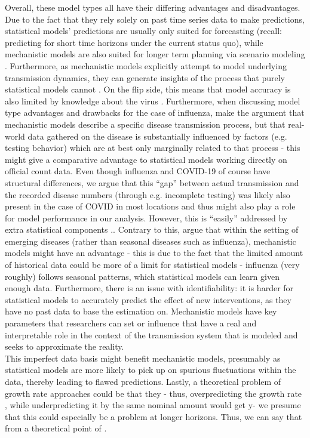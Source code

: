 Overall, these model types all have their differing advantages and disadvantages. Due to the fact that they rely solely on past time series data to make predictions, statistical models' predictions are usually only suited for forecasting (recall: predicting for short time horizons under the current status quo), while mechanistic models are also suited for longer term planning via scenario modeling \cite{reich_collaborative_2022}. Furthermore, as mechanistic models explicitly attempt to model underlying transmission dynamics, they can generate insights of the process that purely statistical models cannot \cite{james_use_2021} . On the flip side, this means that model accuracy is also limited by knowledge about the virus \cite{holmdahl_wrong_2020}. Furthermore, when discussing model type advantages and drawbacks for the case of influenza, \cite{reich_collaborative_2019} make the argument that mechanistic models describe a specific disease transmission process, but that real-world data gathered on the disease is substantially influenced by factors (e.g. testing behavior) which are at best only marginally related to that process - this might give a comparative advantage to statistical models working directly on official count data. Even though influenza and COVID-19 of course have structural differences, we argue that this ``gap'' between actual transmission and the recorded disease numbers (through e.g. incomplete testing) was likely also present in the case of COVID in most locations and thus might also play a role for model performance in our analysis. However, this is ``easily'' addressed by extra statistical components .. Contrary to this, \cite{bracher_evaluating_2021} argue that within the setting of emerging diseases (rather than seasonal diseases such as influenza), mechanistic models might have an advantage - this is due to the fact that the limited amount of historical data could be more of a limit for statistical models - influenza (very roughly) follows seasonal patterns, which statistical models can learn given enough data. Furthermore, there is an issue with identifiability: it is harder for statistical models to accurately predict the effect of new interventions, as they have no past data to base the estimation on. Mechanistic models have key parameters that researchers can set or influence that have a real and interpretable role in the context of the transmission system that is modeled and seeks to approximate the reality.\\ 
This imperfect data basis might benefit mechanistic models, presumably as statistical models are more likely to pick up on spurious fluctuations within the data, thereby leading to flawed predictions. Lastly, a theoretical problem of growth rate approaches could be that they - thus, overpredicting the growth rate , while underpredicting it by the same nominal  amount would get y- we presume that this could especially be a problem at longer horizons. Thus, we can say that from a theoretical point of .\\
